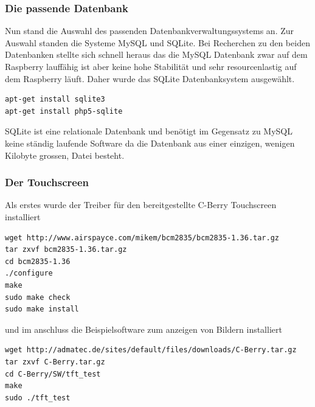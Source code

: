\documentclass[11pt,a4paper]{article} %
\begin{document}
\subsubsection{Die passende Datenbank}
Nun stand die Auswahl des passenden Datenbankverwaltungssystems an. Zur Auswahl standen die Systeme MySQL und SQLite. Bei Recherchen zu den beiden Datenbanken stellte sich schnell heraus das die MySQL Datenbank zwar auf dem Raspberry lauff\"ahig ist aber keine hohe Stabilit\"at und sehr resourcenlastig auf dem Raspberry l\"auft. Daher wurde das SQLite Datenbanksystem ausgew\"ahlt.
\begin{frame}

\begin{lstlisting}
apt-get install sqlite3
apt-get install php5-sqlite
\end{lstlisting}

\end{frame}
 SQLite ist eine relationale Datenbank und ben\"otigt im Gegensatz zu MySQL keine st\"andig laufende Software da die Datenbank aus einer einzigen, wenigen Kilobyte grossen, Datei besteht.
\par
\subsubsection{Der Touchscreen}
Als erstes wurde der Treiber für den bereitgestellte C-Berry Touchscreen installiert
\begin{frame}

\begin{lstlisting}
wget http://www.airspayce.com/mikem/bcm2835/bcm2835-1.36.tar.gz
tar zxvf bcm2835-1.36.tar.gz
cd bcm2835-1.36
./configure
make
sudo make check
sudo make install
\end{lstlisting}

\end{frame}
und im anschluss die Beispielsoftware zum anzeigen von Bildern installiert
\begin{frame}

\begin{lstlisting}
wget http://admatec.de/sites/default/files/downloads/C-Berry.tar.gz
tar zxvf C-Berry.tar.gz
cd C-Berry/SW/tft_test
make
sudo ./tft_test
\end{lstlisting}

\end{frame}
\end{document}

